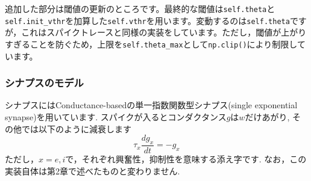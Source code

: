 追加した部分は閾値の更新のところです。最終的な閾値は\texttt{self.theta}と\texttt{self.init\_vthr}を加算した\texttt{self.vthr}を用います。変動するのは\texttt{self.theta}ですが，これはスパイクトレースと同様の実装をしています。ただし，閾値が上がりすぎることを防ぐため，上限を\texttt{self.theta\_max}として\texttt{np.clip()}により制限しています。
\subsubsection{シナプスのモデル}
シナプスにはConductance-basedの単一指数関数型シナプス(single exponential synapse)を用いています. スパイクが入るとコンダクタンス$g$は$w$だけあがり, その他では以下のように減衰します
\begin{equation}
\tau_{x} \frac{dg_x}{d t}=-g_x    
\end{equation}
ただし，$x=e, i$で，それぞれ興奮性，抑制性を意味する添え字です. なお，この実装自体は第2章で述べたものと変わりません. 
